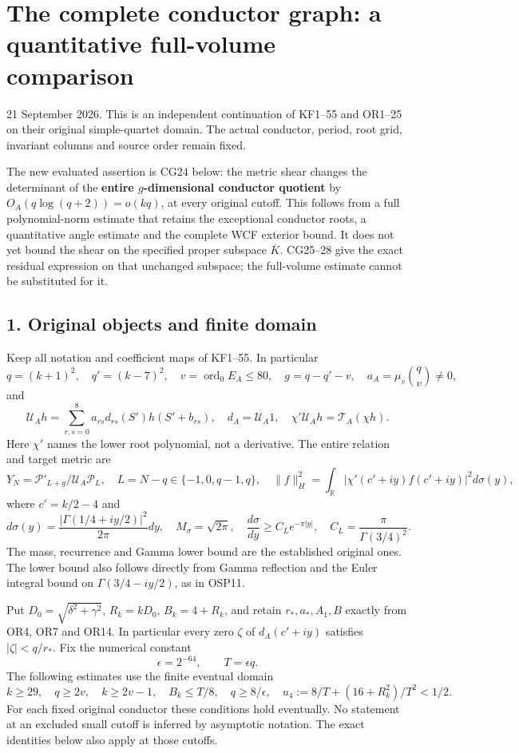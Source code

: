 \section{The complete conductor graph: a quantitative full-volume comparison}\label{the-complete-conductor-graph-a-quantitative-full-volume-comparison}

21 September 2026. This is an independent continuation of KF1--55 and OR1--25 on their original simple-quartet domain. The actual conductor, period, root grid, invariant columns and source order remain fixed.

The new evaluated assertion is CG24 below: the metric shear changes the determinant of the \textbf{entire \(g\)-dimensional conductor quotient} by \(O_A(q\log(q+2))=o(kq)\), at every original cutoff. This follows from a full polynomial-norm estimate that retains the exceptional conductor roots, a quantitative angle estimate and the complete WCF exterior bound. It does not yet bound the shear on the specified proper subspace \(\overline K\). CG25--28 give the exact residual expression on that unchanged subspace; the full-volume estimate cannot be substituted for it.

\subsection{1. Original objects and finite domain}\label{original-objects-and-finite-domain}

Keep all notation and coefficient maps of KF1--55. In particular \[
q=(k+1)^2,\quad q'=(k-7)^2,\quad
v=\operatorname{ord}_0E_A\le80,\quad
g=q-q'-v,\quad a_A=\mu_v\binom qv\ne0,
\tag{CG1}
\] and \[
\mathcal U_Ah=\sum_{r,s=0}^8a_{rs}d_{rs}(S')h(S'+b_{rs}),
\quad d_A=\mathcal U_A1,\quad
\chi'\mathcal U_Ah=\mathcal T_A(\chi h).
\tag{CG2}
\] Here \(\chi'\) names the lower root polynomial, not a derivative. The entire relation and target metric are \[
Y_N=\mathcal P'_{L+g}/\mathcal U_A\mathcal P_L,
\quad L=N-q\in\{-1,0,q-1,q\},
\quad\|f\|_H^2=\int_{\mathbb R}|\chi'(c'+iy)f(c'+iy)|^2d\sigma(y),
\tag{CG3}
\] where \(c'=k/2-4\) and \[
d\sigma(y)=\frac{|\Gamma(1/4+iy/2)|^2}{2\pi}dy,
\quad M_\sigma=\sqrt{2\pi},
\quad \frac{d\sigma}{dy}\ge C_Le^{-\pi|y|},
\quad C_L=\frac\pi{\Gamma(3/4)^2}.
\tag{CG4}
\] The mass, recurrence and Gamma lower bound are the established original ones. The lower bound also follows directly from Gamma reflection and the Euler integral bound on \(\Gamma(3/4-iy/2)\), as in OSP11.

Put \(D_0=\sqrt{\delta^2+\gamma^2}\), \(R_k=kD_0\), \(B_k=4+R_k\), and retain \(r_*,a_*,A_1,B\) exactly from OR4, OR7 and OR14. In particular every zero \(\zeta\) of \(d_A(c'+iy)\) satisfies \(|\zeta|<q/r_*\). Fix the numerical constant \[
\epsilon=2^{-64},\qquad T=\epsilon q.
\tag{CG5}
\] The following estimates use the finite eventual domain \[
k\ge29,\quad q\ge2v,\quad k\ge2v-1,\quad
B_k\le T/8,\quad q\ge8/\epsilon,
\quad u_4:=8/T+(16+R_k^2)/T^2<1/2.
\tag{CG6}
\] For each fixed original conductor these conditions hold eventually. No statement at an excluded small cutoff is inferred by asymptotic notation. The exact identities below also apply at those cutoffs.

